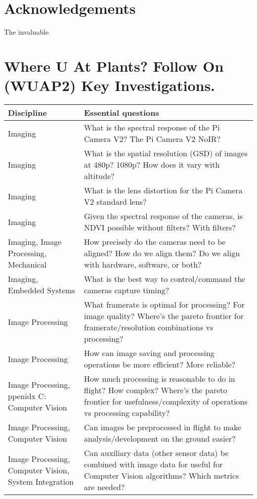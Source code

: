 \documentclass[conference]{IEEEtran} %
\begin{document}
\section*{Acknowledgements}
The invaluable




\onecolumn
\appendices{}


\section{Where U At Plants? Follow On (WUAP2) Key Investigations.}
\noindent
\begin{table}
\begin{tabularx}{\linewidth}{@{}p{}X@{}}
    \textbf{Discipline} & \textbf{Essential questions} \\
    \midrule
    Imaging & What is the spectral response of the Pi Camera V2? The Pi Camera V2 NoIR? \\
    Imaging & What is the spatial resolution (GSD) of images at 480p? 1080p? How does it vary with altitude? \\
    Imaging & What is the lens distortion for the Pi Camera V2 standard lens? \\
    Imaging & Given the spectral response of the cameras, is NDVI possible without filters? With filters? \\
    Imaging, Image Processing, Mechanical & How precisely do the cameras need to be aligned? How do we align them? Do we align with hardware, software, or both? \\
    Imaging, Embedded Systems & What is the best way to control/command the cameras capture timing? \\
    Image Processing & What framerate is optimal for processing? For image quality? Where's the pareto frontier for framerate/resolution combinations vs processing? \\
    Image Processing & How can image saving and processing operations be more efficient? More reliable? \\
    Image Processing, ppenidx C: Computer Vision & How much processing is reasonable to do in flight? How complex? Where's the pareto frontier for usefulness/complexity of operations vs processing capability? \\
    Image Processing, Computer Vision & Can images be preprocessed in flight to make analysis/development on the ground easier? \\
    Image Processing, Computer Vision, System Integration & Can auxiliary data (other sensor data) be combined with image data for useful for Computer Vision algorithms? Which metrics are needed? \\

\end{tabularx}
\end{table}
\end{document}
